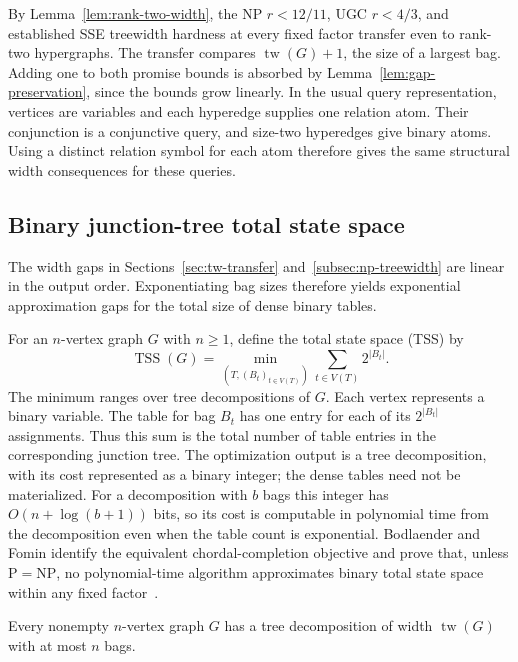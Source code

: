 By Lemma~\ref{lem:rank-two-width}, the NP $r<12/11$, UGC $r<4/3$,
and established SSE treewidth
hardness at every fixed factor transfer even to rank-two hypergraphs.
The transfer compares $\operatorname{tw}(G)+1$, the size of a largest
bag. Adding one to both promise bounds is absorbed by
Lemma~\ref{lem:gap-preservation}, since the bounds grow linearly.
In the usual query representation, vertices are variables and
each hyperedge supplies one relation atom. Their conjunction is
a conjunctive query, and size-two hyperedges give binary atoms.
Using a distinct relation symbol for each atom therefore gives
the same structural width consequences for these queries.

\subsection{Binary junction-tree total state space}
\label{subsec:total-state-space}

The width gaps in Sections~\ref{sec:tw-transfer}
and~\ref{subsec:np-treewidth} are linear in the
output order. Exponentiating bag sizes therefore yields exponential
approximation gaps for the total size of dense binary tables.

For an $n$-vertex graph $G$ with $n\ge1$, define the total state space
(TSS) by
\[
 \operatorname{TSS}(G)=\min_{(T,(B_t)_{t\in V(T)})}
       \sum_{t\in V(T)}2^{|B_t|}.
\]
The minimum ranges over tree decompositions of $G$.
Each vertex represents a binary variable. The table for bag
$B_t$ has one entry for each of its $2^{|B_t|}$ assignments.
Thus this sum is the total number of table entries in the
corresponding junction tree.
The optimization output is a tree decomposition, with its cost
represented as a binary integer; the dense tables need not be
materialized. For a decomposition with $b$ bags this integer has
$O(n+\log(b+1))$ bits, so its cost is computable in polynomial time
from the decomposition even when the table count is exponential.
Bodlaender and Fomin identify the equivalent chordal-completion
objective and prove that, unless $\mathrm{P}=\mathrm{NP}$, no
polynomial-time algorithm approximates binary total state space within
any fixed factor~\cite[Lemma 2, Section 8, and Theorem 32]{BodlaenderFomin2005}.
\begin{lemma}
\label{lem:optimal-width-bag-count}
Every nonempty $n$-vertex graph $G$ has a tree decomposition of width
$\operatorname{tw}(G)$ with at most $n$ bags.
\end{lemma}

